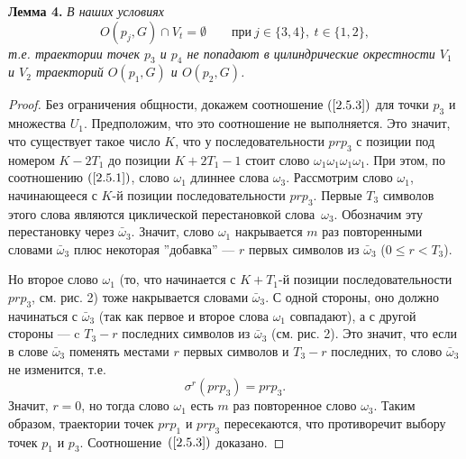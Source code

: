 \documentclass[12pt]{article}
\begin{document}
\textbf{Лемма 4.}\textit{ В наших условиях
\begin{equation}
\label{2.5.3}
O(p_j,G)\cap V_t=\emptyset\qquad\textrm{при}\ j\in\{3,4\},\ t\in\{1,2\},
\end{equation}
т.е. траектории точек $p_3$ и $p_4$ не попадают в цилиндрические окрестности $V_1$ и $V_2$ траекторий $O(p_1,G)$ и $O(p_2,G)$. 
}
\begin{proof}
Без ограничения общности, докажем соотношение $(\ref{2.5.3})$ для точки $p_3$ и множества $U_1$.
Предположим, что это соотношение не выполняется. Это значит, что существует такое число $K$, что у последовательности $pr p_3$ с позиции под номером $K-2T_1$ до позиции $K+2T_1-1$ стоит слово $\omega_1\omega_1\omega_1\omega_1$. При этом, по соотношению $(\ref{2.5.1})$, слово $\omega_1$ длиннее слова $\omega_3$. Рассмотрим слово $\omega_1$, начинающееся с $K$-й позиции последовательности $pr p_3$. Первые $T_3$ символов этого слова являются циклической перестановкой слова~$\omega_3$. Обозначим эту перестановку через $\bar{\omega}_3$. Значит, слово $\omega_1$ накрывается $m$ раз повторенными словами $\bar{\omega}_3$ плюс некоторая ''добавка'' --- $r$ первых символов из $\bar{\omega}_3$ ($0\leq r<T_3$).

Но второе слово $\omega_1$ (то, что начинается с $K+T_1$-й позиции последовательности $pr p_3$, см. рис. 2) тоже накрывается словами $\bar{\omega}_3$. С одной стороны, оно должно начинаться с $\bar{\omega}_3$ (так как первое и второе слова $\omega_1$ совпадают), а с другой стороны --- c $T_3-r$ последних символов из $\bar{\omega}_3$ (см. рис. 2). Это значит, что если в слове $\bar{\omega}_3$ поменять местами $r$ первых символов и $T_3-r$ последних, то слово $\bar{\omega}_3$ не изменится, т.е.
$$\sigma^{r}(pr p_3)=pr p_3.$$
Значит, $r=0$, но тогда слово $\omega_1$ есть $m$ раз повторенное слово $\omega_3$. Таким образом, траектории точек $pr p_1$ и $pr p_3$ пересекаются, что противоречит выбору точек $p_1$ и $p_3$. Соотношение~$(\ref{2.5.3})$ доказано.
\end{proof}
\end{document}
